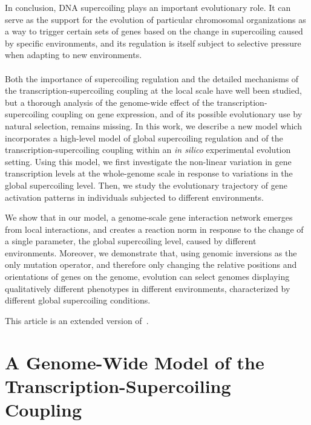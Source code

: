 In conclusion, DNA supercoiling plays an important evolutionary role.
It can serve as the support for the evolution of particular chromosomal organizations as a way to trigger certain sets of genes based on the change in supercoiling caused by specific environments, and its regulation is itself subject to selective pressure when adapting to new environments.

\paragraph{}
Both the importance of supercoiling regulation and the detailed mechanisms of the transcription-supercoiling coupling at the local scale have well been studied, but a thorough analysis of the genome-wide effect of the transcription-supercoiling coupling on gene expression, and of its possible evolutionary use by natural selection, remains missing.
In this work, we describe a new model which incorporates a high-level model of global supercoiling regulation and of the transcription-supercoiling coupling within an \emph{in silico} experimental evolution setting.
Using this model, we first investigate the non-linear variation in gene transcription levels at the whole-genome scale in response to variations in the global supercoiling level.
Then, we study the evolutionary trajectory of gene activation patterns in individuals subjected to different environments.

We show that in our model, a genome-scale gene interaction network emerges from local interactions, and creates a reaction norm in response to the change of a single parameter, the global supercoiling level, caused by different environments.
Moreover, we demonstrate that, using genomic inversions as the only mutation operator, and therefore only changing the relative positions and orientations of genes on the genome, evolution can select genomes displaying qualitatively different phenotypes in different environments, characterized by different global supercoiling conditions.

This article is an extended version of~\cite{grohens2021}.

\section{A Genome-Wide Model of the Transcription-Supercoiling Coupling}
\label{sec:alife:indiv_model}

